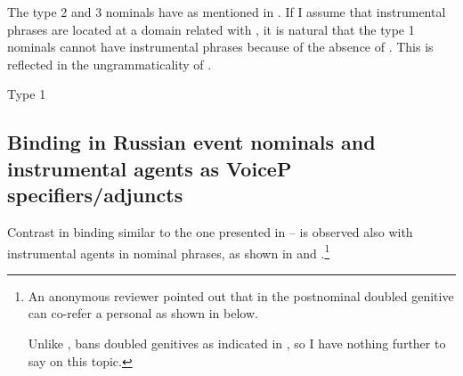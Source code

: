 \documentclass[output=paper,colorlinks,citecolor=brown,newtxmath]{langsci/langscibook}
\begin{document}
\noindent
The type 2 and 3 nominals have  as mentioned in .
If I assume that instrumental  phrases are located at a domain related with , it is natural that the type 1 nominals cannot have  instrumental  phrases because of the absence of .
This is reflected in the ungrammaticality of .

\newpage
\begin{exe}
\ex\label{ud}  {Type 1}
\begin{xlist}

\end{xlist}
\end{exe}


\subsection{Binding in Russian event nominals and instrumental agents as VoiceP specifiers/adjuncts}

Contrast in binding similar to the one presented in -- is observed also with instrumental agents in  nominal phrases, as shown in  and .\footnote{
			An anonymous reviewer pointed out that in  the postnominal doubled genitive can co-refer a personal  as shown in  below.

\z

            \noindent Unlike ,  bans doubled genitives as indicated in , so I have nothing further to say on this topic.}

\begin{exe}
\ex\label{binins}
\begin{xlist}
\end{xlist}
\end{exe}
\end{document}
